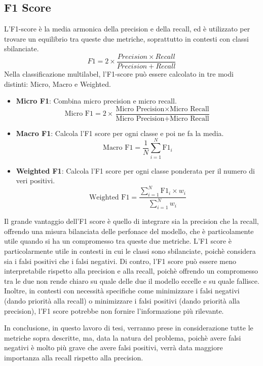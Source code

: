 \documentclass[../../Thesis.tex]{subfiles}
\begin{document}
\subsection{F1 Score}
L'F1-score \`e la media armonica della precision e della recall, ed \`e utilizzato per trovare un equilibrio tra queste due metriche, soprattutto in contesti con classi sbilanciate. 
$$ F1 = 2 \times \frac{Precision \times Recall}{Precision + Recall} $$
Nella classificazione multilabel, l'F1-score pu\`o essere calcolato in tre modi distinti: Micro, Macro e Weighted. 

\begin{itemize}
    \item \textbf{Micro F1}: Combina micro precision e micro recall.
    $$ \text{Micro F1} = 2 \times \frac{\text{Micro Precision} \times \text{Micro Recall}}{\text{Micro Precision} + \text{Micro Recall}} $$
    \item \textbf{Macro F1}: Calcola l'F1 score per ogni classe e poi ne fa la media.
    $$ \text{Macro F1} = \frac{1}{N} \sum_{i=1}^{N} \text{F1}_i $$
    \item \textbf{Weighted F1}: Calcola l'F1 score per ogni classe ponderata per il numero di veri positivi.
    $$ \text{Weighted F1} = \frac{\sum_{i=1}^{N} \text{F1}_i \times w_i}{\sum_{i=1}^{N} w_i} $$
\end{itemize}
Il grande vantaggio dell'F1 score \`e quello di integrare sia la precision che la recall, offrendo una misura bilanciata delle perfonace del modello, che \`e particolamente utile quando si ha un compromesso tra queste due metriche. L'F1 score \`e particolarmente utile in contesti in cui le classi sono sbilanciate, poich\`e considera sia i falsi positivi che i falsi negativi.
Di contro, l'F1 score pu\`o essere meno interpretabile rispetto alla precision e alla recall, poich\`e offrendo un compromesso tra le due non rende chiaro su quale delle due il modello eccelle e su quale fallisce. Inoltre, in contesti con necessit\`a specifiche come minimizzare i falsi negativi (dando priorit\`a alla recall) o minimizzare i falsi positivi (dando priorit\`a alla precision), l'F1 score potrebbe non fornire l'informazione pi\`u rilevante.

In conclusione, in questo lavoro di tesi, verranno prese in considerazione tutte le metriche sopra descritte, ma, data la natura del problema, poich\`e avere falsi negativi \`e molto pi\`u grave che avere falsi positivi, verr\`a data maggiore importanza alla recall rispetto alla precision. 

 
\end{document}
